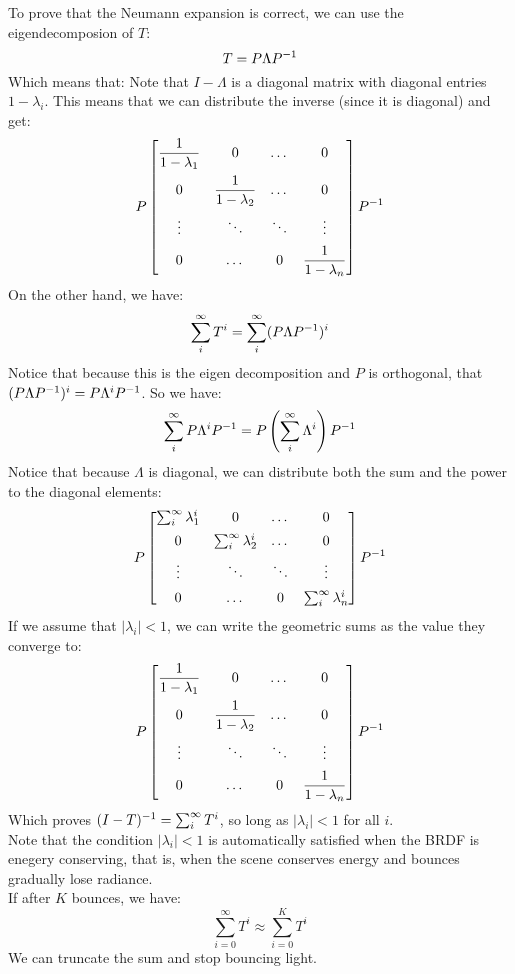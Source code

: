 \documentclass[12pt]{article}
\begin{document}
To prove that the Neumann expansion is correct,
we can use the eigendecomposion of $T$:
\[ T = P\Lambda P^{-1} \]
Which means that:
Note that $I - \Lambda$
is a diagonal matrix with diagonal entries
$1 - \lambda_i$. This means that
we can distribute the inverse (since it is
diagonal) and get:
\[ P \bmat{ 
\dfrac{1}{1-\lambda_1} & 0 & \dots & 0 \vs{5} \\
0 & \dfrac{1}{1-\lambda_2} & \dots & 0 \vs{5} \\
\vdots & \ddots & \ddots & \vdots \vs{5} \\
0 & \dots & 0 & \dfrac{1}{1-\lambda_n} } P\inv \]
On the other hand, we have:
 \[ \sum_i^{\infty} T^i
= \sum_i^{\infty} (P\Lambda P^{-1})^i \]
Notice that because this is the eigen decomposition
and $P$ is orthogonal,
that $(P\Lambda P^{-1})^i = P\Lambda^i P^{-1}$.
So we have:
\[ \sum_i^{\infty} P\Lambda^i P^{-1}
= P \left( \sum_i^{\infty}\Lambda^i \right) P^{-1} \]
Notice that because $\Lambda$ 
is diagonal, we can distribute both the 
sum and the power to the diagonal elements:
\[ P \bmat{ 
\sum_i^{\infty} \lambda_1^i & 0 & \dots & 0 \vs{5} \\
0 & \sum_i^{\infty} \lambda_2^i & \dots & 0 \vs{5} \\
\vdots & \ddots & \ddots & \vdots \vs{5} \\
0 & \dots & 0 & \sum_i^{\infty} \lambda_n^i } P\inv \]
If we assume that $|\lambda_i| < 1$,
we can write the geometric sums
as the value they converge to:
\[ P \bmat{ 
\dfrac{1}{1-\lambda_1} & 0 & \dots & 0 \vs{5} \\
0 & \dfrac{1}{1-\lambda_2} & \dots & 0 \vs{5} \\
\vdots & \ddots & \ddots & \vdots \vs{5} \\
0 & \dots & 0 & \dfrac{1}{1-\lambda_n} } P\inv \]
Which proves  $(I-T)^{-1} =  \sum_i^{\infty} T^i$,
so long as $|\lambda_i| < 1$ for all $i$. \\

Note that the condition $|\lambda_i| < 1$ is automatically
satisfied when the BRDF is enegery conserving, that is,
when the scene conserves energy and bounces gradually
lose radiance. \\

If after $K$ bounces, we have:
\[ \sum_{i=0}^{\infty} T^i \approx \sum_{i=0}^{K} T^i \]
We can truncate the sum and stop bouncing light. \\
\end{document}
